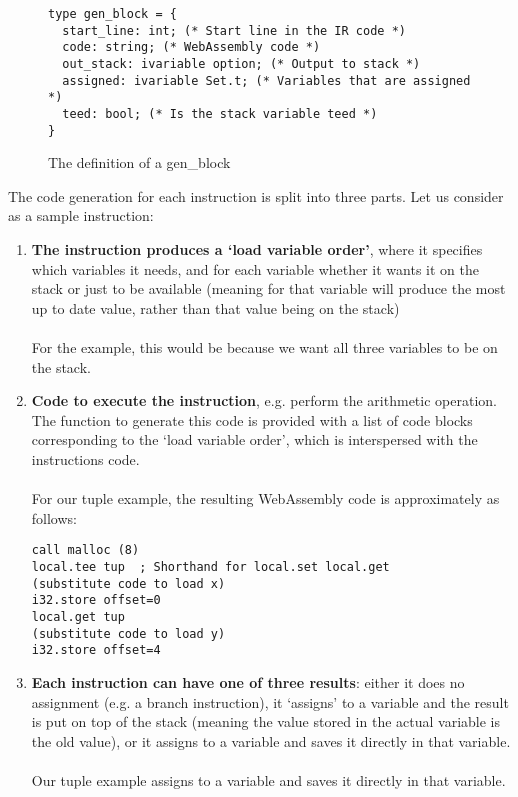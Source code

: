 \begin{figure}[h]
\begin{verbatim}
type gen_block = {
  start_line: int; (* Start line in the IR code *)
  code: string; (* WebAssembly code *)
  out_stack: ivariable option; (* Output to stack *)
  assigned: ivariable Set.t; (* Variables that are assigned *)
  teed: bool; (* Is the stack variable teed *)
}
\end{verbatim}
\caption{The definition of a gen\_block}
\label{fig:genblock}
\end{figure}

The code generation for each instruction is split into three parts. Let us consider  as a sample instruction:
\begin{enumerate}
\item \textbf{The instruction produces a `load variable order'}, where it specifies which variables it needs, and for each variable whether it wants it on the stack or just to be available (meaning  for that variable will produce the most up to date value, rather than that value being on the stack)
\\\\
For the example, this would be  because we want all three variables to be on the stack.

\item \textbf{Code to execute the instruction}, e.g. perform the arithmetic operation. The function to generate this code is provided with a list of code blocks corresponding to the `load variable order', which is interspersed with the instructions code.
\\\\
For our tuple example, the resulting WebAssembly code is approximately as follows:
\begin{verbatim}
call malloc (8)
local.tee tup  ; Shorthand for local.set local.get
(substitute code to load x)
i32.store offset=0
local.get tup
(substitute code to load y)
i32.store offset=4
\end{verbatim}

\item \textbf{Each instruction can have one of three results}: either it does no assignment (e.g. a branch instruction), it `assigns' to a variable and the result is put on top of the stack (meaning the value stored in the actual variable is the old value), or it assigns to a variable and saves it directly in that variable.
\\\\
Our tuple example assigns to a variable and saves it directly in that variable.
\end{enumerate}
